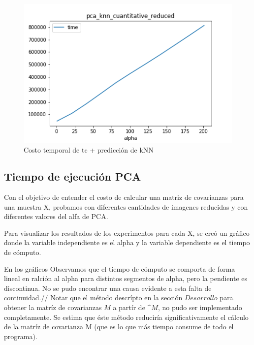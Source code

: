 \begin{figure}[H]
	\begin{center}
      \includegraphics[width=0.4\columnwidth]{imagenes/charuli-des/pca_knn_cuantitative_reduced.png}
      \caption{Costo temporal de tc + predicción de kNN}
      \end{center}
\end{figure}

\subsection{Tiempo de ejecución PCA}

Con el objetivo de entender el costo de calcular una matriz de covarianzas para una muestra X, probamos con diferentes cantidades de imagenes reducidas y con diferentes valores del alfa de PCA. 

Para visualizar los resultados de los experimentos para cada X, se creó un gráfico donde la variable independiente es el alpha y la variable dependiente es el tiempo de cómputo. 

En los gráficos Observamos que el tiempo de cómputo se comporta de forma lineal en ralción al alpha para distintos segmentos de alpha, pero la pendiente es discontinua. No se pudo encontrar una causa evidente a esta falta de continuidad.//
Notar que el método descrípto en la sección $Desarrollo$ para obtener la matríz de covarianzas $M$ a partír de $\^{M}$, no pudo ser implementado completamente. Se estima que éste método reduciría significativamente el cálculo de la matríz de covarianza M (que es lo que más tiempo consume de todo el programa). 


